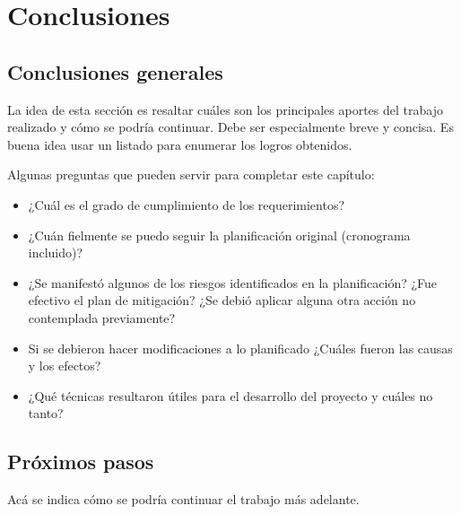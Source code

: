 \chapter{Conclusiones}
\label{Chapter5}

\section{Conclusiones generales }

La idea de esta sección es resaltar cuáles son los principales aportes del trabajo realizado y cómo se podría continuar. Debe ser especialmente breve y concisa. Es buena idea usar un listado para enumerar los logros obtenidos.

Algunas preguntas que pueden servir para completar este capítulo:

\begin{itemize}
\item ¿Cuál es el grado de cumplimiento de los requerimientos?
\item ¿Cuán fielmente se puedo seguir la planificación original (cronograma incluido)?
\item ¿Se manifestó algunos de los riesgos identificados en la planificación? ¿Fue efectivo el plan de mitigación? ¿Se debió aplicar alguna otra acción no contemplada previamente?
\item Si se debieron hacer modificaciones a lo planificado ¿Cuáles fueron las causas y los efectos?
\item ¿Qué técnicas resultaron útiles para el desarrollo del proyecto y cuáles no tanto?
\end{itemize}


\section{Próximos pasos}

Acá se indica cómo se podría continuar el trabajo más adelante.
